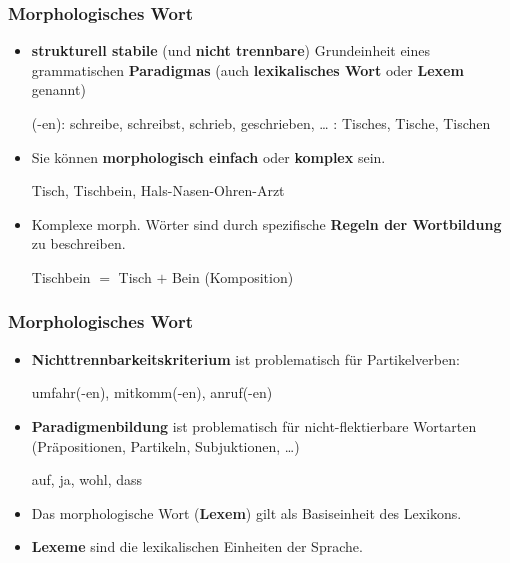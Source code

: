 \begin{frame}
\frametitle{Morphologisches Wort}

\begin{itemize}
	\item \textbf{strukturell stabile} (und \textbf{nicht trennbare}) Grundeinheit eines grammatischen \textbf{Paradigmas} (auch \textbf{lexikalisches Wort} oder \textbf{Lexem} genannt)

	\ea 
		\ea {}(-en): schreibe, schreibst, schrieb, geschrieben, \ldots 
		\ex {}: Tisches, Tische, Tischen
		\z 
	\z 

\pause 
	
	\item Sie können \textbf{morphologisch einfach} oder \textbf{komplex} sein.
	
	\ea Tisch, Tischbein, Hals-Nasen-Ohren-Arzt
	\z 

\pause 
	
	\item Komplexe morph. Wörter sind durch spezifische \textbf{Regeln der Wortbildung} zu beschreiben.
	
	\ea Tischbein $=$ Tisch $+$ Bein (Komposition)
	\z 
\end{itemize}

\end{frame}


\begin{frame}
\frametitle{Morphologisches Wort}

\begin{itemize}
	\item \textbf{Nichttrennbarkeitskriterium} ist problematisch für Partikelverben:
	
	\ea umfahr(-en), mitkomm(-en), anruf(-en)
	\z 
	
	\item \textbf{Paradigmenbildung} ist problematisch für nicht-flektierbare Wortarten (Präpositionen, Partikeln, Subjuktionen, \ldots)
	
	\ea auf, ja, wohl, dass
	\z 
	
	\item Das morphologische Wort (\textbf{Lexem}) gilt als Basiseinheit des Lexikons.
	
	\item \textbf{Lexeme} sind die lexikalischen Einheiten der Sprache.
\end{itemize}

\end{frame}


